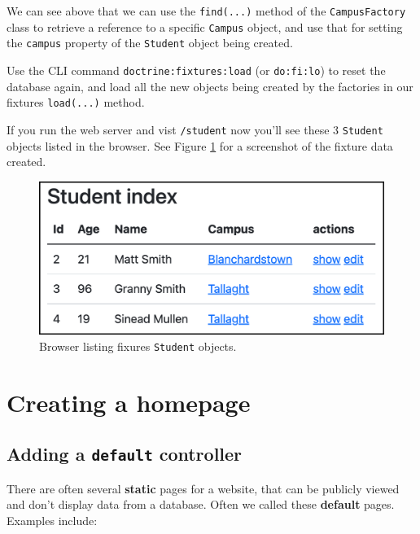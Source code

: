 \documentclass[a4paperpaper,openright]{book}
\begin{document}
We can see above that we can use the \texttt{find(...)} method of the
\texttt{CampusFactory} class to retrieve a reference to a specific
\texttt{Campus} object, and use that for setting the \texttt{campus}
property of the \texttt{Student} object being created.

Use the CLI command \texttt{doctrine:fixtures:load} (or
\texttt{do:fi:lo}) to reset the database again, and load all the new
objects being created by the factories in our fixtures
\texttt{load(...)} method.

If you run the web server and vist \texttt{/student} now you'll see
these 3 \texttt{Student} objects listed in the browser. See Figure
\ref{student_fixtures} for a screenshot of the fixture data created.

\begin{figure}
\centering
\includegraphics[width=1\textwidth,height=\textheight]{./tex2pdf.-b567767c1af560fd/4a9477e0a614fb4c29a9fdb9fd72188e30ab4a6d.png}
\caption{Browser listing fixures \texttt{Student}
objects.\label{student_fixtures}}
\end{figure}

\hypertarget{creating-a-homepage}{%
\chapter{Creating a homepage}\label{creating-a-homepage}}

\hypertarget{adding-a-default-controller}{%
\section{\texorpdfstring{Adding a \texttt{default}
controller}{Adding a default controller}}\label{adding-a-default-controller}}

There are often several \textbf{static} pages for a website, that can be
publicly viewed and don't display data from a database. Often we called
these \textbf{default} pages. Examples include:
\end{document}
